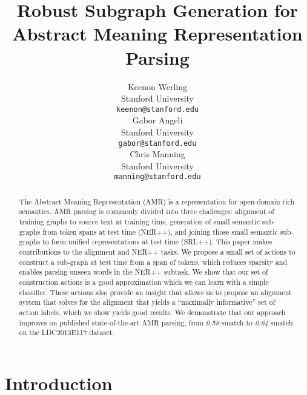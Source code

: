\documentclass[11pt]{article}
\title{Robust Subgraph Generation for Abstract Meaning Representation Parsing}
\author{Keenon Werling \\
  Stanford University\\
  {\tt keenon@stanford.edu} \\\And
  Gabor Angeli \\
  Stanford University\\
  {\tt gabor@stanford.edu} \\\And
  Chris Manning \\
  Stanford University\\
  {\tt manning@stanford.edu} \\}
\date{}
\begin{document}
\maketitle
\begin{abstract}


The Abstract Meaning Representation (AMR) is a representation for open-domain rich semantics.
AMR parsing is commonly divided into three challenges: alignment of training graphs to source text at training time, generation of small semantic sub-graphs from token spans at test time (NER++), and joining those small semantic sub-graphs to form unified representations at test time (SRL++).
This paper makes contributions to the alignment and NER++ tasks.
We propose a small set of actions to construct a sub-graph at test time from a span of tokens, which reduces sparsity and enables parsing unseen words in the NER++ subtask.
We show that our set of construction actions is a good approximation which we can learn with a simple classifier.
These actions also provide an insight that allows us to propose an alignment system that solves for the alignment that yields a ``maximally informative'' set of action labels, which we show yields good results.
We demonstrate that our approach improves on published state-of-the-art AMR parsing, from \textit{0.58} smatch to \textit{0.64} smatch on the LDC2013E117 dataset.

\end{abstract}

\section{Introduction}

\end{document}
